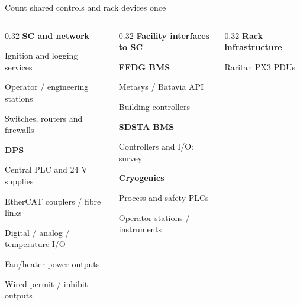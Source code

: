 \begin{frame}{Count shared controls and rack devices once}
\small
\begin{columns}[T,onlytextwidth]
\begin{column}{0.32\textwidth}
\textbf{SC and network}\par
\hspace*{0.8em}Ignition and logging services\par
\hspace*{0.8em}Operator / engineering stations\par
\hspace*{0.8em}Switches, routers and firewalls\par\bigskip
\textbf{DPS}\par
\hspace*{0.8em}Central PLC and 24 V supplies\par
\hspace*{0.8em}EtherCAT couplers / fibre links\par
\hspace*{0.8em}Digital / analog / temperature I/O\par
\hspace*{0.8em}Fan/heater power outputs\par
\hspace*{0.8em}Wired permit / inhibit outputs
\end{column}
\begin{column}{0.32\textwidth}
\textbf{Facility interfaces to SC}\par\medskip
\textbf{FFDG BMS}\par
\hspace*{0.8em}Metasys / Batavia API\par
\hspace*{0.8em}Building controllers\par\medskip
\textbf{SDSTA BMS}\par
\hspace*{0.8em}Controllers and I/O: survey\par\medskip
\textbf{Cryogenics}\par
\hspace*{0.8em}Process and safety PLCs\par
\hspace*{0.8em}Operator stations / instruments
\end{column}
\begin{column}{0.32\textwidth}
\textbf{Rack infrastructure}\par
\hspace*{0.8em}Raritan PX3 PDUs\par

\end{column}
\end{columns}
\end{frame}
